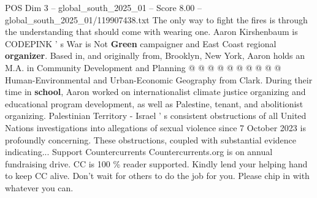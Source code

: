 \begin{textsample}{POS Dim 3 – global\_south\_2025\_01 – Score 8.00 – global\_south\_2025\_01/119907438.txt}
The only way to fight the fires is through the understanding that should come with wearing one.
Aaron Kirshenbaum is CODEPINK ' s War is Not \textbf{Green} campaigner and East Coast regional \textbf{organizer}.
Based in, and originally from, Brooklyn, New York, Aaron holds an M.A. in Community Development and Planning @ @ @ @ @ @ @ @ @ @ Human-Environmental and Urban-Economic Geography from Clark.
During their time in \textbf{school}, Aaron worked on internationalist climate justice organizing and educational program development, as well as Palestine, tenant, and abolitionist organizing.
Palestinian Territory - Israel ' s consistent obstructions of all United Nations investigations into allegations of sexual violence since 7 October 2023 is profoundly concerning.
These obstructions, coupled with substantial evidence indicating...
Support Countercurrents Countercurrents.org is on annual fundraising drive.
CC is 100 \% reader supported.
Kindly lend your helping hand to keep CC alive.
Don't wait for others to do the job for you.
Please chip in with whatever you can.

\end{textsample}
